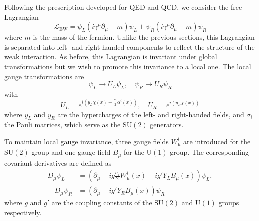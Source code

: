 Following the prescription developed for QED and QCD, we consider the free Lagrangian
\begin{equation}
  \mathcal{L}_{\mathrm{EW}} = \bar{\psi}_{L}(i\gamma^{\mu}\partial_{\mu} - m)\psi_{L} + \bar{\psi}_{R}(i\gamma^{\mu}\partial_{\mu} - m)\psi_{R}
  \label{eq:ew_free_lagrangian}
\end{equation}
where $m$ is the mass of the fermion. Unlike the previous sections, this Lagrangian is separated into left- and right-handed components to reflect the structure of the weak interaction. As before, this Lagrangian is invariant under global transformations but we wish to promote this invariance to a local one. The local gauge transformations are
\begin{equation}
  \psi_{L} \to U_{L}\psi_{L}, \quad
  \psi_{R} \to U_{R}\psi_{R}
  \label{eq:ew_local_symmetry}
\end{equation}
with
\begin{equation}
  U_{L} = e^{i(y_{L}\chi(x) + \frac{\sigma_{i}}{2}\alpha^{i}(x))}, \quad
  U_{R} = e^{i(y_{R}\chi(x))}
  \label{eq:ew_local_transformation}
\end{equation}
where $y_{L}$ and $y_{R}$ are the hypercharges of the left- and right-handed fields, and $\sigma_{i}$ the Pauli matrices, which serve as the $\mathrm{SU}(2)$ generators. 

To maintain local gauge invariance, three gauge fields $W_{\mu}^{i}$ are introduced for the $\mathrm{SU}(2)$ group and one gauge field $B_{\mu}$ for the $\mathrm{U}(1)$ group. The corresponding covariant derivatives are defined as
\begin{align}
  D_{\mu}\psi_{L} &= (\partial_{\mu} - ig\frac{\sigma_{i}}{2}W^{i}_{\mu}(x) - ig'Y_{L}B_{\mu}(x))\psi_{L}, \\ \quad 
  D_{\mu}\psi_{R} &= (\partial_{\mu} - ig'Y_{R}B_{\mu}(x))\psi_{R}
  \label{eq:ew_covariant_derivative} 
\end{align}
where $g$ and $g'$ are the coupling constants of the $\mathrm{SU}(2)$ and $\mathrm{U}(1)$ groups respectively.

